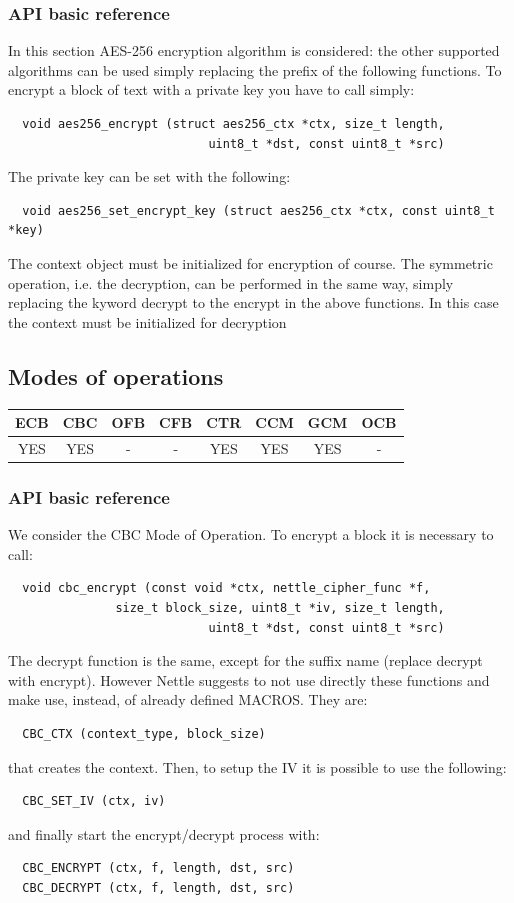 \subsubsection*{API basic reference}
In this section AES-256 encryption algorithm is considered: the other supported algorithms can be used simply replacing the prefix of the following functions. To encrypt a block of text with a private key you have to call simply:
\begin{verbatim}
  void aes256_encrypt (struct aes256_ctx *ctx, size_t length,
                            uint8_t *dst, const uint8_t *src)
\end{verbatim}
The private key can be set with the following:
\begin{verbatim}
  void aes256_set_encrypt_key (struct aes256_ctx *ctx, const uint8_t *key)
\end{verbatim}
The context object must be initialized for encryption of course. The symmetric operation, i.e. the decryption, can be performed in the same way, simply replacing the kyword decrypt to the encrypt in the above functions. In this case the context must be initialized for decryption 
\newpage

\subsection{Modes of operations}
\begin{table}[!h]
	\begin{tabular}{|| c | c | c | c | c | c | c | c ||}
		\textbf{ECB} & \textbf{CBC} & \textbf{OFB} & \textbf{CFB} & \textbf{CTR} & \textbf{CCM} & \textbf{GCM} & \textbf{OCB} \\
		\hline \hline
		YES & YES & - & - & YES  & YES & YES & -\\
	\end{tabular}
\end{table}

\subsubsection*{API basic reference}
We consider the CBC Mode of Operation. To encrypt a block it is necessary to call:
\begin{verbatim}
  void cbc_encrypt (const void *ctx, nettle_cipher_func *f,
               size_t block_size, uint8_t *iv, size_t length,
                            uint8_t *dst, const uint8_t *src)
\end{verbatim}
The decrypt function is the same, except for the suffix name (replace decrypt with encrypt). However Nettle suggests to not use directly these functions and make use, instead, of already defined MACROS. They are:
\begin{verbatim}
  CBC_CTX (context_type, block_size)
\end{verbatim}
that creates the context. Then, to setup the IV it is possible to use the following:
\begin{verbatim}
  CBC_SET_IV (ctx, iv)
\end{verbatim}
and finally start the encrypt/decrypt process with:
\begin{verbatim}
  CBC_ENCRYPT (ctx, f, length, dst, src)
  CBC_DECRYPT (ctx, f, length, dst, src)
 \end{verbatim}
